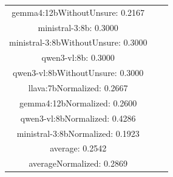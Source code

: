 \documentclass[a4paper]{article}
\begin{document}
\begin{tabular}{ccc}
gemma4:12bWithoutUnsure: 0.2167 \\ ministral-3:8b: 0.3000 \\ ministral-3:8bWithoutUnsure: 0.3000 \\ qwen3-vl:8b: 0.3000 \\ qwen3-vl:8bWithoutUnsure: 0.3000 \\ llava:7bNormalized: 0.2667 \\ gemma4:12bNormalized: 0.2600 \\ qwen3-vl:8bNormalized: 0.4286 \\ ministral-3:8bNormalized: 0.1923 \\ average: 0.2542 \\ averageNormalized: 0.2869 \end{minipage}\\
\end{tabular}

\vspace{5mm}
\end{document}
